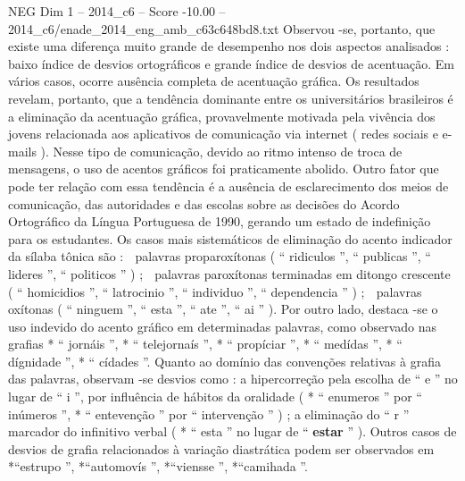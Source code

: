 \begin{textsample}{NEG Dim 1 – 2014\_c6 – Score -10.00 – 2014\_c6/enade\_2014\_eng\_amb\_c63c648bd8.txt}
Observou -se, portanto, que existe uma diferença muito grande de desempenho nos dois aspectos analisados : baixo índice de desvios ortográficos e grande índice de desvios de acentuação.
Em vários casos, ocorre ausência completa de acentuação gráfica.
Os resultados revelam, portanto, que a tendência dominante entre os universitários brasileiros é a eliminação da acentuação gráfica, provavelmente motivada pela vivência dos jovens relacionada aos aplicativos de comunicação via internet ( redes sociais e e-mails ).
Nesse tipo de comunicação, devido ao ritmo intenso de troca de mensagens, o uso de acentos gráficos foi praticamente abolido.
Outro fator que pode ter relação com essa tendência é a ausência de esclarecimento dos meios de comunicação, das autoridades e das escolas sobre as decisões do Acordo Ortográfico da Língua Portuguesa de 1990, gerando um estado de indefinição para os estudantes.
Os casos mais sistemáticos de eliminação do acento indicador da sílaba tônica são :  palavras proparoxítonas ( “ ridiculos ”, “ publicas ”, “ lideres ”, “ politicos ” ) ;  palavras paroxítonas terminadas em ditongo crescente ( “ homicidios ”, “ latrocinio ”, “ individuo ”, “ dependencia ” ) ;  palavras oxítonas ( “ ninguem ”, “ esta ”, “ ate ”, “ ai ” ).
Por outro lado, destaca -se o uso indevido do acento gráfico em determinadas palavras, como observado nas grafias * “ jornáis ”, * “ telejornaís ”, * “ propíciar ”, * “ medídas ”, * “ dígnidade ”, * “ cídades ”.
Quanto ao domínio das convenções relativas à grafia das palavras, observam -se desvios como : a hipercorreção pela escolha de “ e ” no lugar de “ i ”, por influência de hábitos da oralidade ( * “ enumeros ” por “ inúmeros ”, * “ entevenção ” por “ intervenção ” ) ; a eliminação do “ r ” marcador do infinitivo verbal ( * “ esta ” no lugar de “ \textbf{estar} ” ).
Outros casos de desvios de grafia relacionados à variação diastrática podem ser observados em *“estrupo ”, *“automovís ”, *“viensse ”, *“camihada ”.

\end{textsample}
